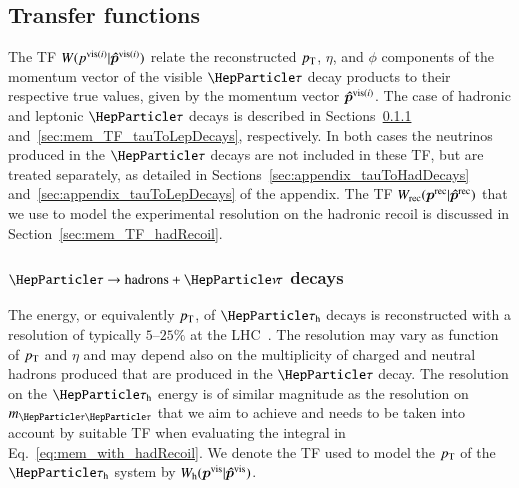 \subsection{Transfer functions}
\label{sec:mem_TF}

The TF $W(p^{\textrm{vis}(i)}|\bm{\hat{p}}^{\textrm{vis}(i)})$ relate the reconstructed
$p_{\textrm{T}}$, $\eta$, and $\phi$ components of the momentum vector of the
visible $\Pgt$ decay products to their respective true values,
given by the momentum vector $\bm{\hat{p}}^{\textrm{vis}(i)}$.
The case of hadronic and leptonic $\Pgt$ decays is described in
Sections~\ref{sec:mem_TF_tauToHadDecays}
and~\ref{sec:mem_TF_tauToLepDecays}, respectively.
In both cases the neutrinos produced in the $\Pgt$ decays are not
included in these TF, but are treated separately, as detailed in Sections~\ref{sec:appendix_tauToHadDecays} and~\ref{sec:appendix_tauToLepDecays} of the appendix.
The TF $W_{\textrm{rec}}( \bm{p}^{\textrm{rec}}| \bm{\hat{p}}^{\textrm{rec}} )$ that we use to model the experimental resolution on the
hadronic recoil is discussed in Section~\ref{sec:mem_TF_hadRecoil}.


\subsubsection{$\Pgt \to \textrm{hadrons} + \Pnut$ decays}
\label{sec:mem_TF_tauToHadDecays}

The energy, or equivalently $p_{\textrm{T}}$, of $\tauh$ decays
is reconstructed with a
resolution of typically $5$--$25\%$ at the
LHC~\cite{Aad:2014rga,TAU-14-001}.
The resolution may vary as function of $p_{\textrm{T}}$ and $\eta$ and may depend
also on the multiplicity of charged and neutral hadrons produced that
are produced in the $\Pgt$ decay.
The resolution on the $\tauh$ energy is of similar magnitude as the
resolution on $m_{\Pgt\Pgt}$ that we aim to achieve and needs to be
taken into account by suitable TF when evaluating the integral in
Eq.~\ref{eq:mem_with_hadRecoil}.
We denote the TF used to model the $p_{\textrm{T}}$ of the $\tauh$ system by
$W_{\textrm{h}}( \bm{p}^{\textrm{vis}} | \bm{\hat{p}}^{\textrm{vis}} )$.

